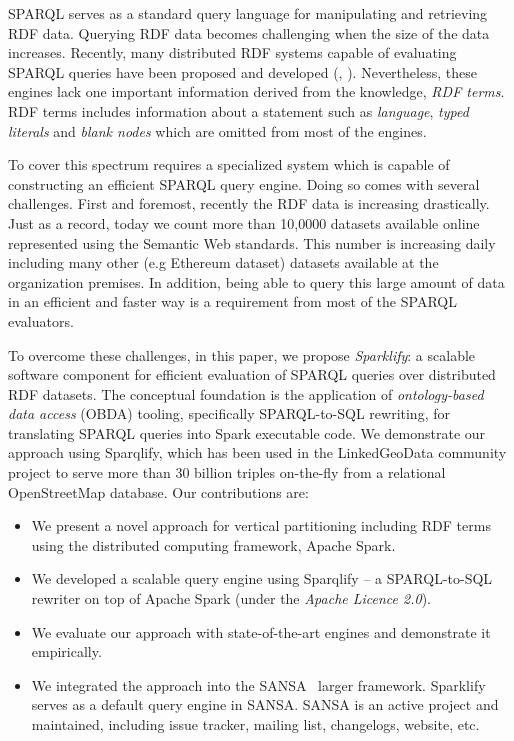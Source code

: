 SPARQL serves as a standard query language for manipulating and retrieving RDF data.
Querying RDF data becomes challenging when the size of the data increases.
Recently, many distributed RDF systems capable of evaluating SPARQL queries have been proposed and developed (\cite{Schatzle:2016:SRQ:2977797.2977806}, \cite{sparqlgx-iswc-2016}).
Nevertheless, these engines lack one important information derived from the knowledge, \emph{RDF terms}.
RDF terms includes information about a statement such as \emph{language}, \emph{typed literals} and \emph{blank nodes} which are omitted from most of the engines.

To cover this spectrum requires a specialized system which is capable of constructing an efficient SPARQL query engine.
Doing so comes with several challenges.
First and foremost, recently the RDF data is increasing drastically.
Just as a record, today we count more than 10,0000 datasets available online represented using the Semantic Web standards.
This number is increasing daily including many other (e.g Ethereum dataset) datasets available at the organization premises.
In addition, being able to query this large amount of data in an efficient and faster way is a requirement from most of the SPARQL evaluators.

To overcome these challenges, in this paper, we propose \emph{Sparklify}: a scalable software component for efficient evaluation of SPARQL queries over distributed RDF datasets. The conceptual foundation is the application of \emph{ontology-based data access} (OBDA) tooling, specifically SPARQL-to-SQL rewriting, for translating SPARQL queries into Spark executable code. We demonstrate our approach using Sparqlify, which has been used in the LinkedGeoData community project to serve more than 30 billion triples on-the-fly from a relational OpenStreetMap database.
Our contributions are:
\begin{itemize}
 \item We present a novel approach for vertical partitioning including RDF terms using the distributed computing framework, Apache Spark.
 \item We developed a scalable query engine using Sparqlify -- a SPARQL-to-SQL rewriter on top of Apache Spark (under the \textit{Apache Licence 2.0}).
 \item We evaluate our approach with state-of-the-art engines and demonstrate it empirically.
 \item We integrated the approach into the SANSA~\cite{lehmann-2017-sansa-iswc} larger framework.
 Sparklify serves as a default query engine in SANSA.
 SANSA is an active project and maintained, including issue tracker, mailing list, changelogs, website, etc.
\end{itemize}

